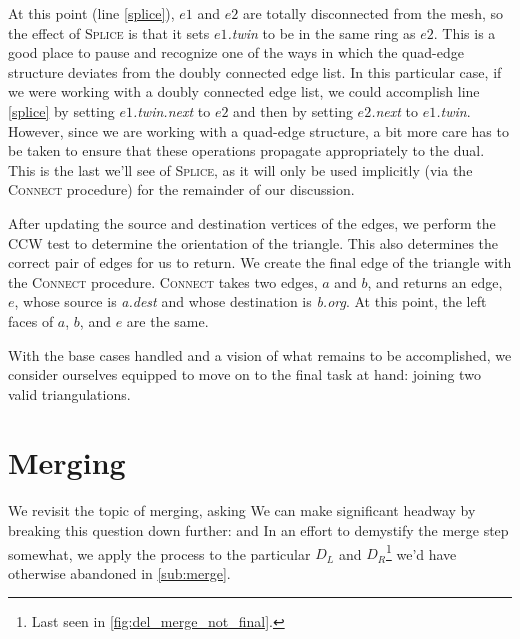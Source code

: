 \documentclass[12pt,twoside]{reedthesis}
\begin{document}
    At this point (line \ref{splice}), $e1$ and $e2$ are totally disconnected from the mesh, so the effect of \textsc{Splice} is that it sets \textit{$e1$.twin} to be in the same ring as $e2$. This is a good place to pause and recognize one of the ways in which the quad-edge structure deviates from the doubly connected edge list. In this particular case, if we were working with a doubly connected edge list, we could accomplish line \ref{splice} by setting \textit{$e1$.twin.next} to \textit{$e2$} and then by setting \textit{$e2$.next} to \textit{$e1$.twin}. However, since we are working with a quad-edge structure, a bit more care has to be taken to ensure that these operations propagate appropriately to the dual. This is the last we'll see of \textsc{Splice}, as it will only be used implicitly (via the \textsc{Connect} procedure) for the remainder of our discussion.\par

    After updating the source and destination vertices of the edges, we perform the \textsc{CCW} test to determine the orientation of the triangle. This also determines the correct pair of edges for us to return. We create the final edge of the triangle with the \textsc{Connect} procedure. \textsc{Connect} takes two edges, $a$ and $b$, and returns an edge, $e$, whose source is \textit{a.dest} and whose destination is \textit{b.org}. At this point, the left faces of $a$, $b$, and $e$ are the same.\par

    With the base cases handled and a vision of what remains to be accomplished, we consider ourselves equipped to move on to the final task at hand: joining two valid triangulations. \par

  \section{Merging} %
  \label{sec:merging}

    We revisit the topic of merging, asking  We can make significant headway by breaking this question down further:  and  In an effort to demystify the merge step somewhat, we apply the process to the particular $D_{L}$ and $D_{R}$\footnote{Last seen in \cref{fig:del_merge_not_final}.} we'd have otherwise abandoned in \cref{sub:merge}.\par
\end{document}
